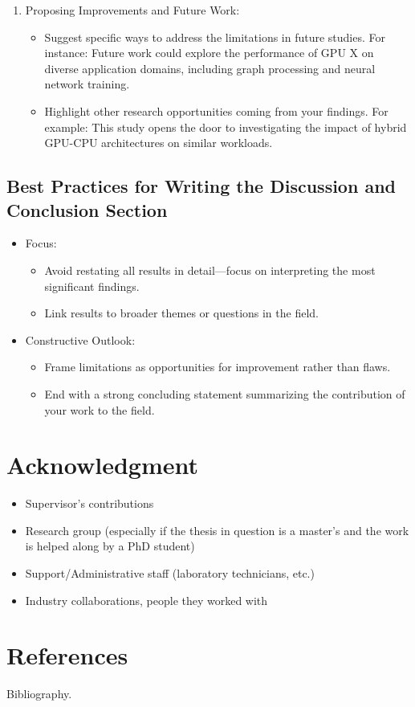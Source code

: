 \documentclass[conference]{IEEEtran}
\begin{document}
\begin{enumerate}
\item Proposing Improvements and Future Work:  
\begin{itemize}
   \item Suggest specific ways to address the limitations in future studies. For instance: Future work could explore the performance of GPU X on diverse application domains, including graph processing and neural network training.
   \item Highlight other research opportunities coming from your findings. For example: This study opens the door to investigating the impact of hybrid GPU-CPU architectures on similar workloads.  
\end{itemize}
\end{enumerate}

\subsection{Best Practices for Writing the Discussion and Conclusion Section}
\begin{itemize}
\item  Focus:  
\begin{itemize}
  \item Avoid restating all results in detail—focus on interpreting the most significant findings.  
  \item Link results to broader themes or questions in the field.  
\end{itemize}

\item  Constructive Outlook:  
\begin{itemize}
  \item Frame limitations as opportunities for improvement rather than flaws.  
  \item End with a strong concluding statement summarizing the contribution of your work to the field.  
\end{itemize}
\end{itemize}
\section*{Acknowledgment}\label{sec:ack}
\begin{itemize}
  \item Supervisor’s contributions
  \item Research group (especially if the thesis in question is a master’s and the work is helped along by a PhD student)
  \item Support/Administrative staff  (laboratory technicians, etc.)
  \item Industry collaborations, people they worked with
\end{itemize}
\section*{References}\label{sec:references}
Bibliography.
%
%
\end{document}
